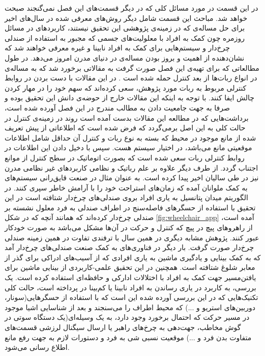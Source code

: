 در این قسمت در مورد مسائل کلی که در دیگر قسمت‌های این فصل نمی‌گنجند صبحت خواهد شد. مباحث این قسمت شامل دیگر روش‌های معرفی شده در سال‌های اخیر برای حل مساله‌ی  که در زمینه‌ی پژوهشی این تحقیق نیستند، کاربردهای  در مسائل روزمره چون کمک به افراد با معلولیت‌های جسمی که مجبور به استفاده از صندلی چرخ‌دار و سیستم‌هایی برای کمک به افراد نابینا و غیره معرفی خواهند شد که نشان‌دهنده‌ از اهمیت و بروز بودن مساله‌ی  در دنیای مدرن امروز می‌دهد.
در طول مطالعاتی که برای تهیه‌ی این فصل صورت گرفت به مقالاتی برخورد شد که به مساله‌ی  در انواع ربات‌ها از بعد کنترل حمله شده است
\cite{geng2013obstacle, dong2015obstacle, yao2015real, yang2016nonlinear}.
در این مقالات با دست بردن در روابط کنترلی مربوط به ربات مورد پژوهش، سعی کرده‌اند که سهم خود را در مهار کردن چالش  ایفا کنند. با توجه به اینکه این مقالات خارج از حوضه‌ی دانش این تحقیق بوده و صرفا به جهت جامعیت دادن به مطالب مندرج در این فصل آورده شده است، برداشت‌هایی که در مطالعه این مقالات بدست آمده است روند  در زمینه‌ی کنترل در حالت کلی به این اصل برمی‌گردد که فرض شده است که اطلاعاتی از پیش تعریف شده از مانع موجود در محیط که بسته به نوع ربات و کنترل آن حداقل شامل اطلاعات موقعیتی مانع می‌باشد، در اختیار سیستم هست. سپس با دخیل دادن این اطلاعات در روابط کنترلی ربات سعی شده است که بصورت اتوماتیک در سطح کنترل از موانع اجتناب گردد.
از طرف دیگر  علاوه بر علم رباتیک و نظامی کاربردهای غیر نظامی مدرن نیز در طی سالیان اخیر پیدا کرده است. به عنوان مثال در صنعت قایق‌رانی سیستم‌های  به کمک ملوانان آمده که زمان‌های استراحت خود را با آرامش خاطر سپری کنند.
در  الگوریتم میدان پتانسیل به یاری افراد بروی صندلی‌های چرخ‌دار شتافته است در این تحقیق با استفاده از حسگرهای فاصله‌سنج در اطراف صندلی به فرد معلول نشسته بر صندلی چرخ‌دار کرده‌اند که همانند آنچه که در شکل \ref{fig:wheelchair_app} آمده است، از راهروهای پیچ در پیچ که کنترل و حرکت در آن‌ها مشکل می‌باشد به صورت خودکار عبور کنند. پژوهش مشابه دیگری در همین سال با ترفندی تفاوت در همین زمینه‌ صندلی چرخ‌دار صورت گرفت.
بار دیگر در  فناوری‌های  به کمک صنعت صندلی‌های چرخ‌دار آمد که به کمک بینایی و یادگیری ماشین به یاری افرادی که از آسیب‌های ادراکی برای گذر از معابر شلوغ شتافته است. همچنین در این تحقیق علمی-کاربردی از بینایی ماشین برای یافتن‌مسیر جهت کمک به افراد با اختلالات ادارکی و حافظه‌ای استفاده کرده است. یک بررسی، به کاربرد  در یاری رساندن به افراد نابینا یا کم‌بینا در  پرداخته است، حالت کلی تکنیک‌هایی که در این بررسی آورده شده این است که با استفاده از حسگر‌هایی(سونار، دوربین‌های استریو و ...) که محیط اطراف را می‌سنجند و بعد از شناسایی اشیا موجود در مسیر حرکت که احتمال برخورد وجود دارد، به یک وسیله‌ای(یک دستگاه سوتی در گوش مخاطب، جهت‌دهی به چرخ‌های راهبر یا ارسال سیگنال لرزشی قسمت‌های متفاوت بدن فرد و ...) موقعیت نسبی شی به فرد و دستورات لازم به جهت رفع مانع اطلاع رسانی می‌شود.

